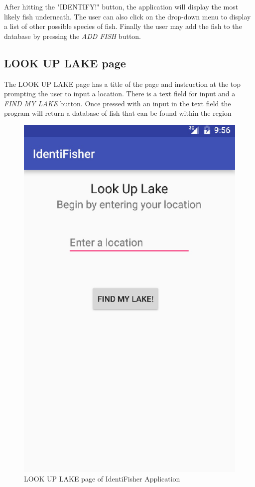 \documentclass{article}
\begin{document}
After hitting the "IDENTIFY!" button, the application will display the most likely fish underneath. The user can also click on the drop-down
menu to display a list of other possible species of fish. Finally the user may add the fish to the database by pressing the \textit{ADD FISH} button.\\

\subsection{LOOK UP LAKE page}
The LOOK UP LAKE page has a title of the page and instruction at the top prompting the user to input a location. There is a text field for input and a
\textit{FIND MY LAKE} button. Once pressed with an input in the text field the program will return a database of fish that can be found within the
region\\
\begin{figure}[H]
	\includegraphics[scale=0.30]{Lookup.png}
	\caption{LOOK UP LAKE page of IdentiFisher Application}
\end{figure}
\end{document}
